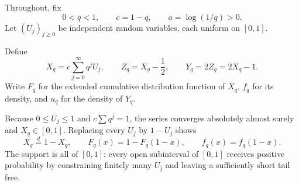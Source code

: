 \documentclass[11pt]{article}
\numberwithin{equation}{section}
\theoremstyle{definition}
\theoremstyle{remark}
\begin{document}
Throughout, fix
\[
 0<q<1,
 \qquad c=1-q,
 \qquad a=\log(1/q)>0.
\]
Let $(U_j)_{j\ge0}$ be independent random variables, each uniform on $[0,1]$.

\begin{definition}
\label{p10:def:qfabius}
Define
\begin{equation}
 X_q=c\sum_{j=0}^{\infty}q^jU_j,
 \qquad
 Z_q=X_q-\frac12,
 \qquad
 Y_q=2Z_q=2X_q-1.                         \label{p10:eq:q-law}
\end{equation}
Write $F_q$ for the extended cumulative distribution function of $X_q$,
$f_q$ for its density, and $u_q$ for the density of $Y_q$.
\end{definition}

Because $0\le U_j\le1$ and $c\sum q^j=1$, the series converges absolutely almost surely and
$X_q\in[0,1]$.  Replacing every $U_j$ by $1-U_j$ shows
\begin{equation}
 X_q\overset d=1-X_q,
 \qquad F_q(x)=1-F_q(1-x),
 \qquad f_q(x)=f_q(1-x).                   \label{p10:eq:symmetry}
\end{equation}
The support is all of $[0,1]$: every open subinterval of $[0,1]$ receives positive
probability by constraining finitely many $U_j$ and leaving a sufficiently short tail free.
\end{document}
